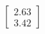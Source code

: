 \documentclass[preview]{standalone}
\begin{document}
\begin{align*}
\begin{bmatrix} 2.63 \\ 3.42 \end{bmatrix}
\end{align*}
\end{document}
